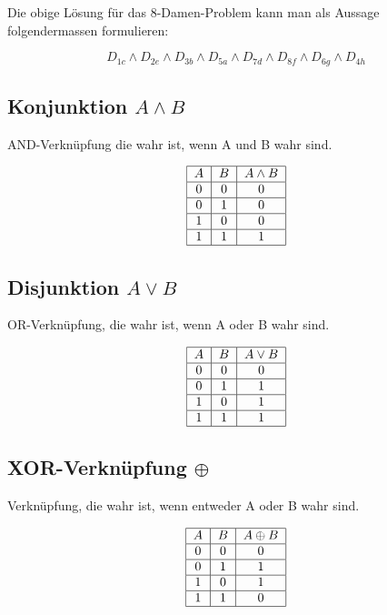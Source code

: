 \documentclass[12pt, a4paper, oneside]{article}
\begin{document}
Die obige Lösung für das 8-Damen-Problem kann man als Aussage folgendermassen formulieren:

\begin{equation}
  D_{1c} \land D_{2e} \land D_{3b} \land D_{5a} \land D_{7d} \land D_{8f} \land D_{6g} \land D_{4h}
\end{equation}


\subsection{Konjunktion $A \land B$}
AND-Verknüpfung die wahr ist, wenn A und B wahr sind.

\begin{equation}
  \begin{tabular}{| c | c | c |}
    \hline
    $A$ & $B$ & $A \land B$ \\ \hline
    0 & 0 & 0 \\ \hline
    0 & 1 & 0 \\ \hline 
    1 & 0 & 0 \\ \hline
    1 & 1 & 1 \\ \hline
  \end{tabular}
\end{equation}


\subsection{Disjunktion $A \lor B$}
OR-Verknüpfung, die wahr ist, wenn A oder B wahr sind.

\begin{equation}
  \begin{tabular}{| c | c | c |}
    \hline
    $A$ & $B$ & $A \lor B$ \\ \hline
    0 & 0 & 0 \\ \hline
    0 & 1 & 1 \\ \hline
    1 & 0 & 1 \\ \hline
    1 & 1 & 1 \\ \hline
  \end{tabular}
\end{equation}


\subsection{XOR-Verknüpfung $\oplus$}
Verknüpfung, die wahr ist, wenn entweder A oder B wahr sind.

\begin{equation}
  \begin{tabular}{| c | c | c |}
    \hline
    $A$ & $B$ & $A \oplus B$ \\ \hline
    0 & 0 & 0 \\ \hline
    0 & 1 & 1 \\ \hline
    1 & 0 & 1 \\ \hline
    1 & 1 & 0 \\ \hline
  \end{tabular}
\end{equation}
\end{document}

